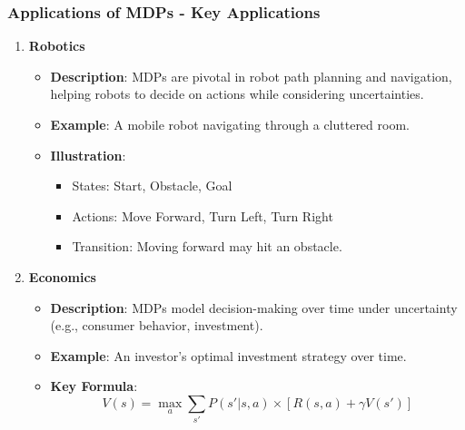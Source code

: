 \documentclass{beamer}
\begin{document}
\begin{frame}[fragile]
    \frametitle{Applications of MDPs - Key Applications}
    \begin{enumerate}
        \item \textbf{Robotics}
        \begin{itemize}
            \item \textbf{Description}: MDPs are pivotal in robot path planning and navigation, helping robots to decide on actions while considering uncertainties.
            \item \textbf{Example}: A mobile robot navigating through a cluttered room.
            \item \textbf{Illustration}:
            \begin{itemize}
                \item States: {Start, Obstacle, Goal}
                \item Actions: {Move Forward, Turn Left, Turn Right}
                \item Transition: Moving forward may hit an obstacle.
            \end{itemize}
        \end{itemize}

        \item \textbf{Economics}
        \begin{itemize}
            \item \textbf{Description}: MDPs model decision-making over time under uncertainty (e.g., consumer behavior, investment).
            \item \textbf{Example}: An investor's optimal investment strategy over time.
            \item \textbf{Key Formula}:
            \begin{equation}
                V(s) = \max_a \sum_{s'} P(s' | s, a) \times [R(s, a) + \gamma V(s')]
            \end{equation}
        \end{itemize}
    \end{enumerate}
\end{frame}
\end{document}
